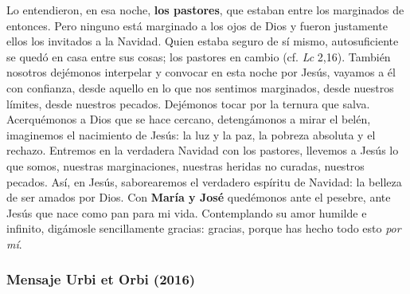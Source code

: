 \begin{body}
	Lo entendieron, en esa noche, \textbf{los pastores}, que estaban entre los marginados de entonces. Pero ninguno está marginado a los ojos de Dios y fueron justamente ellos los invitados a la Navidad. Quien estaba seguro de sí mismo, autosuficiente se quedó en casa entre sus cosas; los pastores en cambio  (cf. \emph{Lc} 2,16). También nosotros dejémonos interpelar y convocar en esta noche por Jesús, vayamos a él con confianza, desde aquello en lo que nos sentimos marginados, desde nuestros límites, desde nuestros pecados. Dejémonos tocar por la ternura que salva. Acerquémonos a Dios que se hace cercano, detengámonos a mirar el belén, imaginemos el nacimiento de Jesús: la luz y la paz, la pobreza absoluta y el rechazo. Entremos en la verdadera Navidad con los pastores, llevemos a Jesús lo que somos, nuestras marginaciones, nuestras heridas no curadas, nuestros pecados. Así, en Jesús, saborearemos el verdadero espíritu de Navidad: la belleza de ser amados por Dios. Con \textbf{María y José} quedémonos ante el pesebre, ante Jesús que nace como pan para mi vida. Contemplando su amor humilde e infinito, digámosle sencillamente gracias: gracias, porque has hecho todo esto \emph{por mí}.
\end{body}

\subsubsection{Mensaje Urbi et Orbi (2016)}

